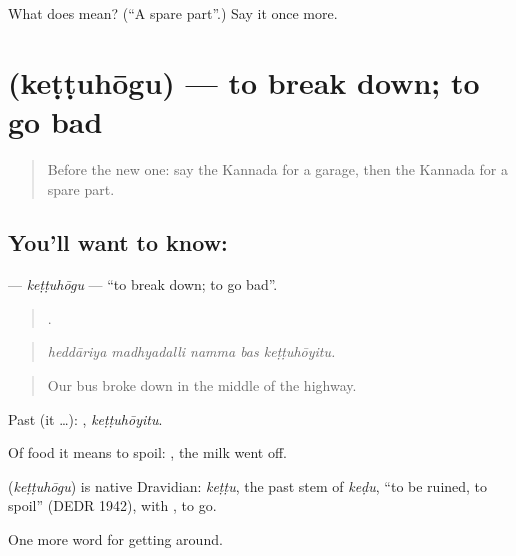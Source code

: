 \begin{tcolorbox}[breakable,colback=teal!4,colframe=teal!35!black,title={Before you move on}]
What does  mean? (\textquotedblleft{}A spare part\textquotedblright{}.) Say it once more.
\end{tcolorbox}
\section[\texorpdfstring{\kn{ಕೆಟ್ಟುಹೋಗು} (keṭṭuhōgu)}{ಕೆಟ್ಟುಹೋಗು (keṭṭuhōgu)}]{ (keṭṭuhōgu) — to break down; to go bad}

\label{lesson:KA-C450-kettuhogu}



\begin{quote}
Before the new one: say the Kannada for a garage, then the Kannada for a spare part.
\end{quote}

\subsection*{You'll want to know: }
\textbf{} — \emph{keṭṭuhōgu} — \textquotedblleft{}to break down; to go bad\textquotedblright{}.

\begin{quote}
    .
\end{quote}

\begin{quote}
\emph{heddāriya madhyadalli namma bas keṭṭuhōyitu.}
\end{quote}

\begin{quote}
Our bus broke down in the middle of the highway.
\end{quote}

Past (it …): , \emph{keṭṭuhōyitu}.

Of food it means to spoil:  , the milk went off.

\begin{cousinweb}
\textbf{} (\emph{keṭṭuhōgu}) is native Dravidian: \emph{keṭṭu}, the past stem of \emph{keḍu}, \textquotedblleft{}to be ruined, to spoil\textquotedblright{} (DEDR 1942), with , to go.
\end{cousinweb}

\begin{grammarlens}[title={What you've built}]
One more word for getting around.
\end{grammarlens}

